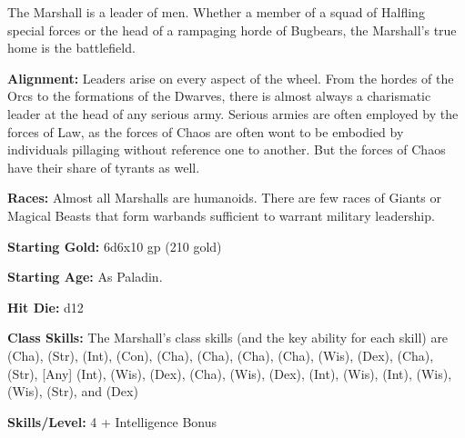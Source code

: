 
The Marshall is a leader of men. Whether a member of a squad of Halfling special forces or the head of a rampaging horde of Bugbears, the Marshall's true home is the battlefield.

\textbf{Alignment:} Leaders arise on every aspect of the wheel. From the hordes of the Orcs to the formations of the Dwarves, there is almost always a charismatic leader at the head of any serious army. Serious armies are often employed by the forces of Law, as the forces of Chaos are often wont to be embodied by individuals pillaging without reference one to another. But the forces of Chaos have their share of tyrants as well.

\textbf{Races:} Almost all Marshalls are humanoids. There are few races of Giants or Magical Beasts that form warbands sufficient to warrant military leadership.

\textbf{Starting Gold:} 6d6x10 gp (210 gold)

\textbf{Starting Age:} As Paladin.

\textbf{Hit Die:} d12

\textbf{Class Skills:} The Marshall's class skills (and the key ability for each skill) are  (Cha),  (Str),  (Int),  (Con),  (Cha),  (Cha),  (Cha),  (Cha),  (Wis),  (Dex),  (Cha),  (Str),  [Any] (Int),  (Wis),  (Dex),  (Cha),  (Wis),  (Dex),  (Int),  (Wis),  (Int),  (Wis),  (Wis),  (Str), and  (Dex)

\textbf{Skills/Level:} 4 + Intelligence Bonus

\goodbab{}
\goodfor{}
\goodref{}
\goodwil{}

\begin{classtable}
\end{classtable}

